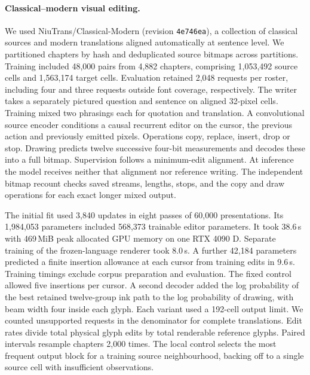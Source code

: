 \paragraph{Classical--modern visual editing.}
We used NiuTrans/Classical-Modern (revision \texttt{4e746ea}), a collection of classical sources and modern translations aligned automatically at sentence level. We partitioned chapters by hash and deduplicated source bitmaps across partitions. Training included 48,000 pairs from 4,882 chapters, comprising 1,053,492 source cells and 1,563,174 target cells. Evaluation retained 2,048 requests per roster, including four and three requests outside font coverage, respectively. The writer takes a separately pictured question and sentence on aligned 32-pixel cells. Training mixed two phrasings each for quotation and translation. A convolutional source encoder conditions a causal recurrent editor on the cursor, the previous action and previously emitted pixels. Operations copy, replace, insert, drop or stop. Drawing predicts twelve successive four-bit measurements and decodes these into a full bitmap. Supervision follows a minimum-edit alignment. At inference the model receives neither that alignment nor reference writing. The independent bitmap recount checks saved streams, lengths, stops, and the copy and draw operations for each exact longer mixed output.

The initial fit used 3,840 updates in eight passes of 60,000 presentations. Its 1,984,053 parameters included 568,373 trainable editor parameters. It took 38.6\,s with 469\,MiB peak allocated GPU memory on one RTX 4090 D. Separate training of the frozen-language renderer took 8.0\,s. A further 42,184 parameters predicted a finite insertion allowance at each cursor from training edits in 9.6\,s. Training timings exclude corpus preparation and evaluation. The fixed control allowed five insertions per cursor. A second decoder added the log probability of the best retained twelve-group ink path to the log probability of drawing, with beam width four inside each glyph. Each variant used a 192-cell output limit. We counted unsupported requests in the denominator for complete translations. Edit rates divide total physical glyph edits by total renderable reference glyphs. Paired intervals resample chapters 2,000 times. The local control selects the most frequent output block for a training source neighbourhood, backing off to a single source cell with insufficient observations.
